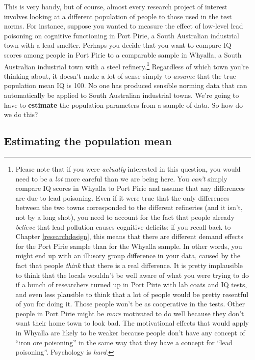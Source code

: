 \documentclass[
]{book}
\theoremstyle{definition}
\theoremstyle{definition}
\theoremstyle{definition}
\theoremstyle{definition}
\theoremstyle{remark}
\begin{document}
This is very handy, but of course, almost every research project of interest involves looking at a different population of people to those used in the test norms. For instance, suppose you wanted to measure the effect of low-level lead poisoning on cognitive functioning in Port Pirie, a South Australian industrial town with a lead smelter. Perhaps you decide that you want to compare IQ scores among people in Port Pirie to a comparable sample in Whyalla, a South Australian industrial town with a steel refinery.\footnote{Please note that if you were \emph{actually} interested in this question, you would need to be a \emph{lot} more careful than we are being here. You \emph{can't} simply compare IQ scores in Whyalla to Port Pirie and assume that any differences are due to lead poisoning. Even if it were true that the only differences between the two towns corresponded to the different refineries (and it isn't, not by a long shot), you need to account for the fact that people already \emph{believe} that lead pollution causes cognitive deficits: if you recall back to Chapter \ref{researchdesign}, this means that there are different demand effects for the Port Pirie sample than for the Whyalla sample. In other words, you might end up with an illusory group difference in your data, caused by the fact that people \emph{think} that there is a real difference. It is pretty implausible to think that the locals wouldn't be well aware of what you were trying to do if a bunch of researchers turned up in Port Pirie with lab coats and IQ tests, and even less plausible to think that a lot of people would be pretty resentful of you for doing it. Those people won't be as cooperative in the tests. Other people in Port Pirie might be \emph{more} motivated to do well because they don't want their home town to look bad. The motivational effects that would apply in Whyalla are likely to be weaker because people don't have any concept of ``iron ore poisoning'' in the same way that they have a concept for ``lead poisoning''. Psychology is \emph{hard}.} Regardless of which town you're thinking about, it doesn't make a lot of sense simply to \emph{assume} that the true population mean IQ is 100. No one has produced sensible norming data that can automatically be applied to South Australian industrial towns. We're going to have to \textbf{estimate} the population parameters from a sample of data. So how do we do this?

\hypertarget{estimating-the-population-mean}{%
\subsection{Estimating the population mean}\label{estimating-the-population-mean}}
\end{document}
